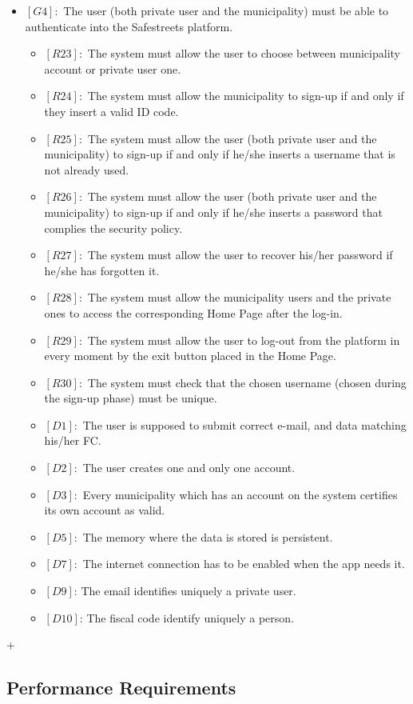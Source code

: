 \documentclass[titlepage]{article}
\begin{document}
\begin{itemize}
 
 \item $[G4]:$ The user (both private user and the municipality) must be able to authenticate into the Safestreets platform.
 \begin{itemize}
 \item $[R23]:$ The system must allow the user to choose between municipality account or private user one.
 \item $[R24]:$ The system must allow the municipality to sign-up if and only if they insert a valid ID code.
 \item $[R25]:$ The system must allow the user (both private user and the municipality) to sign-up if and only if he/she inserts a username that is not already used.
 \item $[R26]:$ The system must allow the user (both private user and the municipality) to sign-up if and only if he/she inserts a password that complies the security policy.
 \item $[R27]:$ The system must allow the user to recover his/her password if he/she has forgotten it.
 \item $[R28]:$ The system must allow the municipality users and the private ones to access the corresponding Home Page after the log-in.
 \item $[R29]:$ The system must allow the user to log-out from the platform in every moment by the exit button placed in the Home Page.
 \item $[R30]:$ The system must check that the chosen username (chosen during the sign-up phase) must be unique. 
 \item $[D1]:$ The user is supposed to submit correct e-mail, and data matching his/her FC.
 \item $[D2]:$ The user creates one and only one account.
 \item $[D3]:$ Every municipality which has an account on the system certifies its own account as valid.
 \item $[D5]:$ The memory where the data is stored is persistent.
 \item $[D7]:$ The internet connection has to be enabled when the app needs it.
 \item $[D9]$: The email identifies uniquely a private user.
 \item $[D10]$: The fiscal code identify uniquely a person.
 \end{itemize}
 
 
\end{itemize}


+
\subsection{Performance Requirements}
\end{document}
